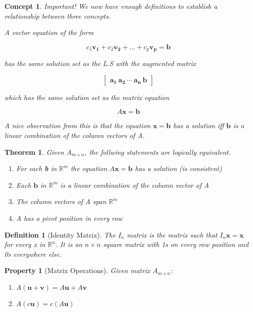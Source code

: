 \documentclass[12pt]{report}
\newtheorem{thm}{Theorem}
\newtheorem{dfn}{Definition}
\newtheorem{cpt}{Concept}
\newtheorem{prop}{Property}
\begin{document}
\begin{cpt}
Important! We now have enough definitions to establish a relationship between three concepts. 

A vector equation of the form 

\begin{equation}c_1\bm{v_1}+c_2\bm{v_2}+\ldots +c_p\bm{v_p}=\bm{b}\end{equation} 

has the same solution set as the L.S with the augmented matrix 

\begin{equation}\begin{bmatrix}\bm{a_1}\:\bm{a_2}\:\cdots\:\bm{a_n}\:\bm{b}\end{bmatrix}\end{equation}

which has the same solution set as the matrix equation

\begin{equation}A\bm{x}=\bm{b}\end{equation}

A nice observation from this is that the equation $\bm{x}=\bm{b}$ has a solution iff $\bm{b}$ is a linear combination of the column vectors of A.

\end{cpt}

\begin{thm}
Given $A_{m\times n}$, the follwing statements are logically equivalent.
\begin{enumerate}
\item For each \textbf{b} in $\mathbb{R}^m$ the equation $A\bm{x}=\bm{b}$ has a solution (is consistent)
\item Each $\bm{b}$ in $\mathbb{R}^m$ is a linear combination of the column vector of A
\item The column vectors of A span $\mathbb{R}^m$
\item A has a pivot position in every row
\end{enumerate}
\end{thm}

\begin{dfn}[Identity Matrix]
The $I_n$ matrix is the matrix such that $I_n\bm{x}=\bm{x}$ for every x in $\mathbb{R}^n$. It is an $n\times n$ square matrix with 1s on every row position and 0s everywhere else.
\end{dfn}

\begin{prop}[Matrix Operations]
Given matrix $A_{m\times n}$:
\begin{enumerate}
\item $A(\bm{u}+\bm{v})=A\bm{u}+A\bm{v}$
\item $A(c\bm{u})=c(A\bm{u})$
\end{enumerate}
\end{prop}
\end{document}
